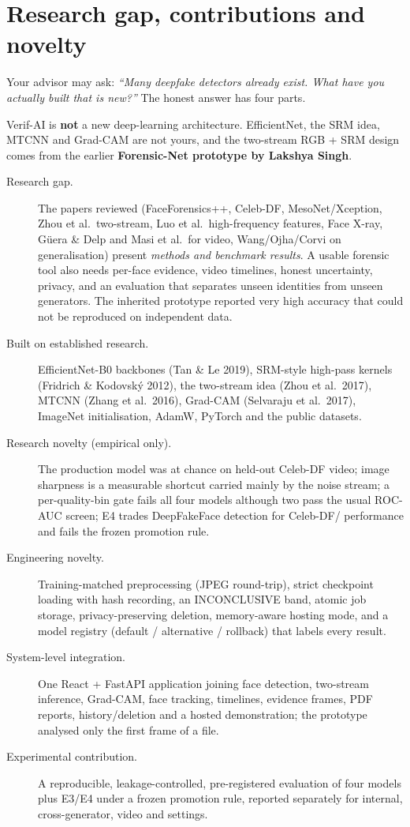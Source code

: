 \documentclass[11pt,a4paper]{report}
\newcommand{\code}[1]{\texttt{\detokenize{#1}}}
\begin{document}
\section{Research gap, contributions and novelty}
\label{sec:hb-novelty}
Your advisor may ask: \emph{``Many deepfake detectors already exist. What have you actually built that is new?''} The honest answer has four parts.
\begin{keybox}
Verif-AI is \textbf{not} a new deep-learning architecture. EfficientNet, the SRM idea, MTCNN and Grad-CAM are not yours, and the two-stream RGB + SRM design comes from the earlier \textbf{Forensic-Net prototype by Lakshya Singh}.
\end{keybox}
\begin{description}
\item[Research gap.] The papers reviewed (FaceForensics++, Celeb-DF, MesoNet/Xception, Zhou et al.\ two-stream, Luo et al.\ high-frequency features, Face X-ray, G\"uera \& Delp and Masi et al.\ for video, Wang/Ojha/Corvi on generalisation) present \emph{methods and benchmark results}. A usable forensic tool also needs per-face evidence, video timelines, honest uncertainty, privacy, and an evaluation that separates unseen identities from unseen generators. The inherited prototype reported very high accuracy that could not be reproduced on independent data.
\item[Built on established research.] EfficientNet-B0 backbones (Tan \& Le 2019), SRM-style high-pass kernels (Fridrich \& Kodovsk\'y 2012), the two-stream idea (Zhou et al.\ 2017), MTCNN (Zhang et al.\ 2016), Grad-CAM (Selvaraju et al.\ 2017), ImageNet initialisation, AdamW, PyTorch and the public datasets.
\item[Research novelty (empirical only).] The production model was at chance on held-out Celeb-DF video; image sharpness is a measurable shortcut carried mainly by the noise stream; a per-quality-bin gate fails all four models although two pass the usual ROC-AUC screen; E4 trades DeepFakeFace detection for Celeb-DF/\code{modern\_test} performance and fails the frozen promotion rule.
\item[Engineering novelty.] Training-matched preprocessing (JPEG round-trip), strict checkpoint loading with hash recording, an INCONCLUSIVE band, atomic job storage, privacy-preserving deletion, memory-aware hosting mode, and a model registry (default / alternative / rollback) that labels every result.
\item[System-level integration.] One React + FastAPI application joining face detection, two-stream inference, Grad-CAM, face tracking, timelines, evidence frames, PDF reports, history/deletion and a hosted demonstration; the prototype analysed only the first frame of a file.
\item[Experimental contribution.] A reproducible, leakage-controlled, pre-registered evaluation of four models plus E3/E4 under a frozen promotion rule, reported separately for internal, cross-generator, video and \code{modern\_test} settings.
\end{description}
\end{document}
